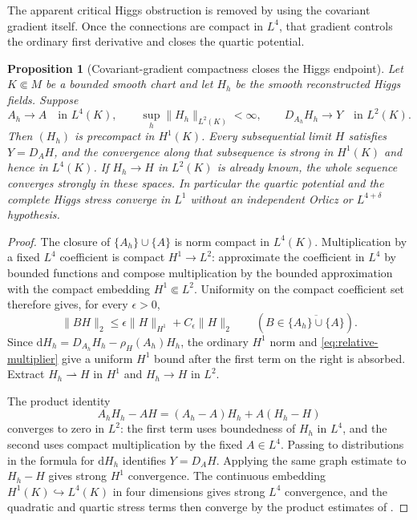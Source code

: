 \documentclass[11pt]{article}
\numberwithin{equation}{section}
\newtheorem{proposition}[proposition]{Proposition}
\theoremstyle{definition}
\theoremstyle{remark}
\newcommand{\dd}{\mathrm d}
\newcommand{\norm}[1]{\lVert#1\rVert}
\begin{document}
The apparent critical Higgs obstruction is removed by using the covariant
gradient itself. Once the connections are compact in $L^4$, that gradient
controls the ordinary first derivative and closes the quartic potential.

\begin{proposition}[Covariant-gradient compactness closes the Higgs endpoint]
\label{prop:covariant-higgs-endpoint}
Let $K\Subset M$ be a bounded smooth chart and let $H_h$ be the smooth reconstructed Higgs fields.  Suppose
\[
 A_h\to A\quad\text{in }L^4(K),\qquad
 \sup_h\norm{H_h}_{L^2(K)}<\infty,
 \qquad D_{A_h}H_h\to Y\quad\text{in }L^2(K).
\]
Then $(H_h)$ is precompact in $H^1(K)$.  Every subsequential limit $H$ satisfies $Y=D_AH$, and the convergence along that subsequence is strong in $H^1(K)$ and hence in $L^4(K)$.  If $H_h\to H$ in $L^2(K)$ is already known, the whole sequence converges strongly in these spaces.  In particular the quartic potential and the complete Higgs stress converge in $L^1$ without an independent Orlicz or $L^{4+\delta}$ hypothesis.
\end{proposition}
\begin{proof}
The closure of $\{A_h\}\cup\{A\}$ is norm compact in $L^4(K)$.  Multiplication by a fixed $L^4$ coefficient is compact $H^1\to L^2$: approximate the coefficient in $L^4$ by bounded functions and compose multiplication by the bounded approximation with the compact embedding $H^1\Subset L^2$.  Uniformity on the compact coefficient set therefore gives, for every $\epsilon>0$,
\begin{equation}
 \norm{BH}_2\le \epsilon\norm H_{H^1}+C_\epsilon\norm H_2
 \qquad(B\in\overline{\{A_h\}\cup\{A\}}).
 \label{eq:relative-multiplier}
\end{equation}
Since $\dd H_h=D_{A_h}H_h-\rho_H(A_h)H_h$, the ordinary $H^1$ norm and \eqref{eq:relative-multiplier} give a uniform $H^1$ bound after the first term on the right is absorbed.  Extract $H_h\rightharpoonup H$ in $H^1$ and $H_h\to H$ in $L^2$.

The product identity
\[
 A_hH_h-AH=(A_h-A)H_h+A(H_h-H)
\]
converges to zero in $L^2$: the first term uses boundedness of $H_h$ in $L^4$, and the second uses compact multiplication by the fixed $A\in L^4$.  Passing to distributions in the formula for $\dd H_h$ identifies $Y=D_AH$.  Applying the same graph estimate to $H_h-H$ gives strong $H^1$ convergence.  The continuous embedding $H^1(K)\hookrightarrow L^4(K)$ in four dimensions gives strong $L^4$ convergence, and the quadratic and quartic stress terms then converge by the product estimates of .
\end{proof}
\end{document}
